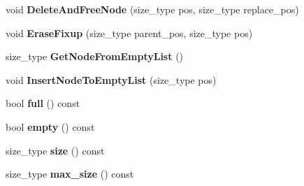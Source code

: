\begin{DoxyCompactItemize}
\item 
\hypertarget{classlsf_1_1container_1_1detail_1_1RBTreeState_a51afa35c2e46966f69ec6a631e7b66b2}{
void {\bfseries DeleteAndFreeNode} (size\_\-type pos, size\_\-type replace\_\-pos)}
\label{classlsf_1_1container_1_1detail_1_1RBTreeState_a51afa35c2e46966f69ec6a631e7b66b2}

\item 
\hypertarget{classlsf_1_1container_1_1detail_1_1RBTreeState_a69205eed45131987ea8aa1e35ddad46e}{
void {\bfseries EraseFixup} (size\_\-type parent\_\-pos, size\_\-type pos)}
\label{classlsf_1_1container_1_1detail_1_1RBTreeState_a69205eed45131987ea8aa1e35ddad46e}

\item 
\hypertarget{classlsf_1_1container_1_1detail_1_1RBTreeState_a98a6487978f6015c9858fd2276a579bb}{
size\_\-type {\bfseries GetNodeFromEmptyList} ()}
\label{classlsf_1_1container_1_1detail_1_1RBTreeState_a98a6487978f6015c9858fd2276a579bb}

\item 
\hypertarget{classlsf_1_1container_1_1detail_1_1RBTreeState_a5723cc48bc6b6ddb92a4ac5f3215a89d}{
void {\bfseries InsertNodeToEmptyList} (size\_\-type pos)}
\label{classlsf_1_1container_1_1detail_1_1RBTreeState_a5723cc48bc6b6ddb92a4ac5f3215a89d}

\item 
\hypertarget{classlsf_1_1container_1_1detail_1_1RBTreeState_aaea717df20640b7edc6840f3ad2f83fe}{
bool {\bfseries full} () const }
\label{classlsf_1_1container_1_1detail_1_1RBTreeState_aaea717df20640b7edc6840f3ad2f83fe}

\item 
\hypertarget{classlsf_1_1container_1_1detail_1_1RBTreeState_add8883141b61eb6443ef23c600b9b25f}{
bool {\bfseries empty} () const }
\label{classlsf_1_1container_1_1detail_1_1RBTreeState_add8883141b61eb6443ef23c600b9b25f}

\item 
\hypertarget{classlsf_1_1container_1_1detail_1_1RBTreeState_ac5959dc2763766b506a6a9cf5a2fdd7a}{
size\_\-type {\bfseries size} () const }
\label{classlsf_1_1container_1_1detail_1_1RBTreeState_ac5959dc2763766b506a6a9cf5a2fdd7a}

\item 
\hypertarget{classlsf_1_1container_1_1detail_1_1RBTreeState_a3040bd1cab2b8499665736754311e4a5}{
size\_\-type {\bfseries max\_\-size} () const }
\label{classlsf_1_1container_1_1detail_1_1RBTreeState_a3040bd1cab2b8499665736754311e4a5}


\end{DoxyCompactItemize}
